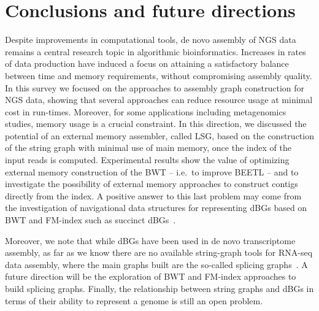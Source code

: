 \documentclass[11pt,oneside,a4paper]{article}
\begin{document}
\section{Conclusions and future directions}
\label{sec:conclusions}
Despite improvements in computational tools, de novo assembly of NGS data remains a central research topic in algorithmic bioinformatics.
Increases in rates of data production have induced a focus on attaining a satisfactory balance between time and memory requirements, without compromising assembly quality.
In this survey we focused on the approaches to assembly graph construction for NGS data, showing that several approaches can reduce resource usage at minimal cost in run-times.
Moreover, for some applications including metagenomics studies, memory usage is a crucial constraint.
In this direction, we discussed the potential of an external memory assembler, called LSG, based on the construction of the string graph with minimal use of main memory, once the index of the input reads is computed. Experimental results show the value of optimizing external memory construction of the BWT – i.e.~to improve BEETL – and to investigate the possibility of external memory approaches to construct contigs directly from the index.
A positive answer to this last problem may come from the investigation of navigational data structures for representing dBGs based on BWT and FM-index such as succinct dBGs~\cite{baier_graphical_2016}.

Moreover, we note that while dBGs have been used in de novo transcriptome assembly, as far as we know there are no available string-graph tools for RNA-seq data assembly, where the main graphs built are the so-called splicing graphs~\cite{Beretta2013}.
A future direction will be the exploration of BWT and FM-index approaches to build splicing graphs.
Finally, the relationship between  string graphs and dBGs in terms of their ability to represent a genome is still an open problem.

\end{document}
